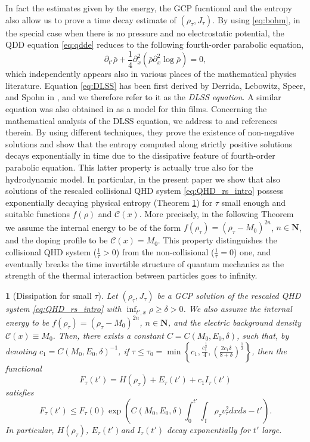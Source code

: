 \documentclass[leqno]{amsart}
\theoremstyle{plain}
\newtheorem{thm}{\protect\theoremname}
\theoremstyle{definition}
\theoremstyle{remark}
\theoremstyle{plain}
\theoremstyle{plain}
\providecommand{\theoremname}{Theorem}
\def\T{{\mathbb T}}%
\def\N{{\mathbf N}}%
\def\d{{\partial}}
\numberwithin{equation}{section}
\begin{document}
In fact the estimates given by the energy, the GCP fucntional and the entropy also allow us to prove a time decay estimate of $(\rho_\tau,J_\tau)$. By using \eqref{eq:bohm}, in the special case when there is no pressure and no electrostatic potential, the QDD equation \eqref{eq:qdde} reduces to the following fourth-order parabolic equation,
\begin{equation}\label{eq:DLSS}
\d_{t'}\bar\rho+\frac14\d_x^2(\bar\rho\d_x^2\log\bar\rho)=0,
\end{equation}
which independently appears also in various places of the  mathematical physics literature. Equation \eqref{eq:DLSS} has been first derived by Derrida, Lebowitz, Speer, and Spohn in \cite{DLSS1, DLSS2}, and we therefore refer to it as the \emph{DLSS equation}. A similar equation was also obtained in  \cite{Ber, BP1} as a model for thin films. Concerning the mathematical analysis of the DLSS equation, we address to \cite{DGJ,GST,JM} and references therein. By using different techniques, they prove the existence of non-negative solutions and show that the entropy computed along strictly positive solutions decays exponentially in time due to the dissipative feature of fourth-order parabolic equation. 
\newline
This latter property is actually true also for the hydrodynamic model. In particular, in the present paper we show that also solutions of the rescaled collisional QHD system \eqref{eq:QHD_rs_intro} possess exponentially decaying physical entropy (Theorem \ref{thm:disp}) for $\tau$ small enough and suitable functions $f(\rho)$ and $\mathcal{C}(x)$.  More precisely, in the following Theorem we assume the internal energy to be of the form $f(\rho_\tau)=(\rho_\tau-M_0)^{2n}$, $n\in\N$, and the doping profile to be $\mathcal{C}(x)=M_0$. This property distinguishes the collisional QHD system ($\frac{1}{\tau}>0$) from the non-collisional ($\frac{1}{\tau}=0$) one, and eventually breaks the time invertible structure of quantum mechanics as the strength of the thermal interaction between particles goes to infinity.


\begin{thm}[Dissipation for small $\tau$]\label{thm:disp}
Let $(\rho_\tau,J_\tau)$ be a GCP solution of the rescaled QHD system \eqref{eq:QHD_rs_intro} with $\inf_{t',x}\rho\geq\delta>0$. We also assume the internal energy to be $f(\rho_\tau)=(\rho_\tau-M_0)^{2n}$, $n\in\N$, and the electric background density $\mathcal{C}(x)\equiv M_0$. Then, there exists a constant $C=C(M_0, E_0, \delta)$, 
such that, by denoting $c_1 =C(M_0,E_0,\delta)^{-1}$, if $\tau\leq \tau_0=\min\left\{c_1, \frac{c_1^\frac12}{4},\left(\frac{2c_1\delta}{8+\delta}\right)^\frac12\right\}$, then the functional 
\[
F_\tau(t')=H(\rho_\tau)+E_\tau(t')+c_1 I_\tau(t')
\]
satisfies
\begin{equation}
F_\tau(t')\leq F_\tau(0)\exp\left(C(M_0,E_0, \delta)\int_0^{t'}\int_\T\rho_\tau v_\tau^2dxds-t'\right).
\end{equation}
In particular, $H(\rho_\tau)$, $E_\tau(t')$and $I_\tau(t')$ decay exponentially for $t'$ large.
\end{thm}
\end{document}
